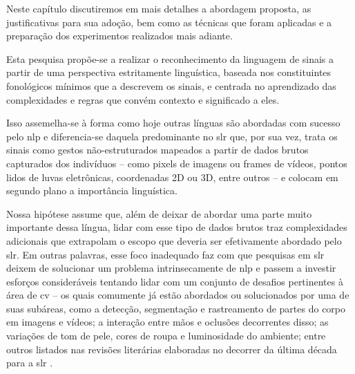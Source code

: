 Neste capítulo discutiremos em mais detalhes a abordagem proposta, as justificativas para sua adoção, bem como as técnicas que foram aplicadas e a preparação dos experimentos realizados mais adiante.

Esta pesquisa propõe-se a realizar o reconhecimento da linguagem de sinais a partir de uma perspectiva estritamente linguística, baseada nos constituintes fonológicos mínimos que a descrevem os sinais, e centrada no aprendizado das complexidades e regras que convém contexto e significado a eles.

Isso assemelha-se à forma como hoje outras línguas são abordadas com sucesso pelo \acrfull{nlp} e diferencia-se daquela predominante no \acrfull{slr} que, por sua vez, trata os sinais como gestos não-estruturados mapeados a partir de dados brutos capturados dos indivíduos -- como pixels de imagens ou frames de vídeos, pontos lidos de luvas eletrônicas, coordenadas 2D ou 3D, entre outros -- e colocam em segundo plano a importância linguística.


Nossa hipótese assume que, além de deixar de abordar uma parte muito importante dessa língua, lidar com esse tipo de dados brutos traz complexidades adicionais que extrapolam o escopo que deveria ser efetivamente abordado pelo \acrshort{slr}.
Em outras palavras, esse foco inadequado faz com que pesquisas em \acrshort{slr} deixem de solucionar um problema intrinsecamente de \acrshort{nlp} e passem a investir esforços consideráveis tentando lidar com um conjunto de desafios pertinentes à área de \acrfull{cv} -- os quais comumente já estão abordados ou solucionados por uma de suas subáreas, como a detecção, segmentação e rastreamento de partes do corpo em imagens e vídeos; a interação entre mãos e oclusões decorrentes disso; as variações de tom de pele, cores de roupa e luminosidade do ambiente; entre outros listados nas revisões literárias elaboradas no decorrer da última década para a \acrshort{slr} \cite{papastratis-2021-ai-technologies-sl,rastgoo-2021-slr-deep-survey,koller-2020-quantitative-survey-slr,bragg-2019-slr-interdisciplinary,wadhawan-2019-slr-literature-review,suharjito-2018-feature-extraction-survey,joksimoski-2022-scoping-review,cooper-2011-slr}.

